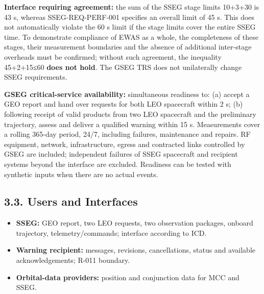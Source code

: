 \textbf{Interface requiring agreement:} the sum of the SSEG stage limits 10+3+30 is 43 s, whereas SSEG-REQ-PERF-001 specifies an overall limit of 45 s. This does not automatically violate the 60 s limit if the stage limits cover the entire SSEG time. To demonstrate compliance of EWAS as a whole, the completeness of these stages, their measurement boundaries and the absence of additional inter-stage overheads must be confirmed; without such agreement, the inequality 45+2+15≤60 \textbf{does not hold}. The GSEG TRS does not unilaterally change SSEG requirements.

\textbf{GSEG critical-service availability:} simultaneous readiness to: (a) accept a GEO report and hand over requests for both LEO spacecraft within 2 s; (b) following receipt of valid products from two LEO spacecraft and the preliminary trajectory, assess and deliver a qualified warning within 15 s. Measurements cover a rolling 365-day period, 24/\allowbreak{}7, including failures, maintenance and repairs. RF equipment, network, infrastructure, egress and contracted links controlled by GSEG are included; independent failures of SSEG spacecraft and recipient systems beyond the interface are excluded. Readiness can be tested with synthetic inputs when there are no actual events.

\subsection{3.3. Users and Interfaces}\label{external-interfaces-and-operational-users}

\begin{itemize}
\item \textbf{SSEG:} GEO report, two LEO requests, two observation packages, onboard trajectory, telemetry/\allowbreak{}commands; interface according to ICD.
\item \textbf{Warning recipient:} messages, revisions, cancellations, status and available acknowledgements; R-011 boundary.
\item \textbf{Orbital-data providers:} position and conjunction data for MCC and SSEG.
\end{itemize}
